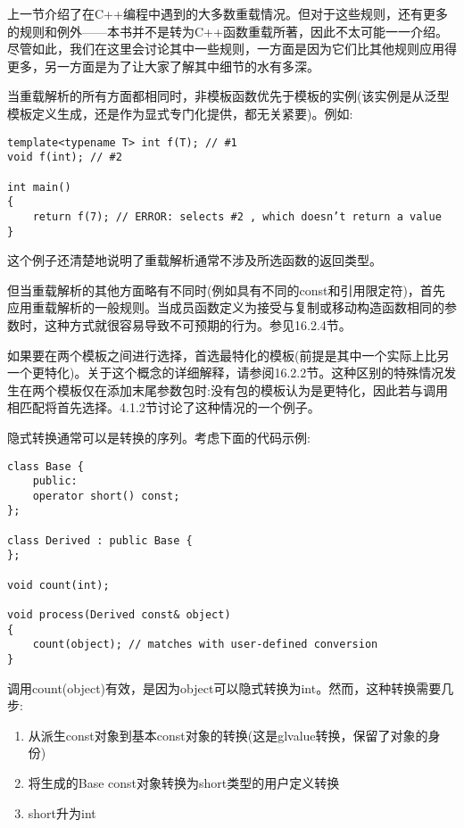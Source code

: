 
上一节介绍了在C++编程中遇到的大多数重载情况。但对于这些规则，还有更多的规则和例外——本书并不是转为C++函数重载所著，因此不太可能一一介绍。尽管如此，我们在这里会讨论其中一些规则，一方面是因为它们比其他规则应用得更多，另一方面是为了让大家了解其中细节的水有多深。


当重载解析的所有方面都相同时，非模板函数优先于模板的实例(该实例是从泛型模板定义生成，还是作为显式专门化提供，都无关紧要)。例如:

\begin{lstlisting}[style=styleCXX]
template<typename T> int f(T); // #1
void f(int); // #2

int main()
{
	return f(7); // ERROR: selects #2 , which doesn’t return a value
}
\end{lstlisting}

这个例子还清楚地说明了重载解析通常不涉及所选函数的返回类型。

但当重载解析的其他方面略有不同时(例如具有不同的const和引用限定符)，首先应用重载解析的一般规则。当成员函数定义为接受与复制或移动构造函数相同的参数时，这种方式就很容易导致不可预期的行为。参见16.2.4节。

如果要在两个模板之间进行选择，首选最特化的模板(前提是其中一个实际上比另一个更特化)。关于这个概念的详细解释，请参阅16.2.2节。这种区别的特殊情况发生在两个模板仅在添加末尾参数包时:没有包的模板认为是更特化，因此若与调用相匹配将首先选择。4.1.2节讨论了这种情况的一个例子。


隐式转换通常可以是转换的序列。考虑下面的代码示例:

\begin{lstlisting}[style=styleCXX]
class Base {
	public:
	operator short() const;
};

class Derived : public Base {
};

void count(int);

void process(Derived const& object)
{
	count(object); // matches with user-defined conversion
}
\end{lstlisting}

调用count(object)有效，是因为object可以隐式转换为int。然而，这种转换需要几步:

\begin{enumerate}
\item 
从派生const对象到基本const对象的转换(这是glvalue转换，保留了对象的身份)

\item 
将生成的Base const对象转换为short类型的用户定义转换

\item 
short升为int
\end{enumerate}

